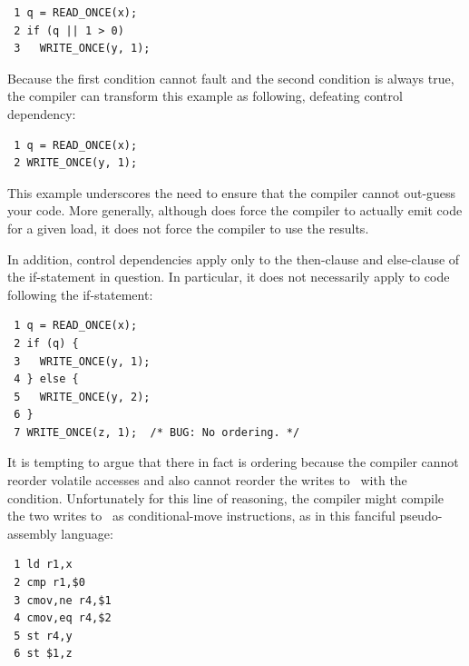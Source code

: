 \vspace{5pt}
\begin{minipage}[t]{\columnwidth}
\scriptsize
\begin{verbatim}
 1 q = READ_ONCE(x);
 2 if (q || 1 > 0)
 3   WRITE_ONCE(y, 1);
\end{verbatim}
\end{minipage}
\vspace{5pt}

Because the first condition cannot fault and the second condition is
always true, the compiler can transform this example as following,
defeating control dependency:

\vspace{5pt}
\begin{minipage}[t]{\columnwidth}
\scriptsize
\begin{verbatim}
 1 q = READ_ONCE(x);
 2 WRITE_ONCE(y, 1);
\end{verbatim}
\end{minipage}
\vspace{5pt}

This example underscores the need to ensure that the compiler cannot
out-guess your code.
More generally, although  does force
the compiler to actually emit code for a given load, it does not force
the compiler to use the results.

In addition, control dependencies apply only to the then-clause and
else-clause of the if-statement in question.
In particular, it does
not necessarily apply to code following the if-statement:

\vspace{5pt}
\begin{minipage}[t]{\columnwidth}
\scriptsize
\begin{verbatim}
 1 q = READ_ONCE(x);
 2 if (q) {
 3   WRITE_ONCE(y, 1);
 4 } else {
 5   WRITE_ONCE(y, 2);
 6 }
 7 WRITE_ONCE(z, 1);  /* BUG: No ordering. */
\end{verbatim}
\end{minipage}
\vspace{5pt}

It is tempting to argue that there in fact is ordering because the
compiler cannot reorder volatile accesses and also cannot reorder
the writes to~ with the condition.
Unfortunately for this line
of reasoning, the compiler might compile the two writes to~ as
conditional-move instructions, as in this fanciful pseudo-assembly
language:

\vspace{5pt}
\begin{minipage}[t]{\columnwidth}
\scriptsize
\begin{verbatim}
 1 ld r1,x
 2 cmp r1,$0
 3 cmov,ne r4,$1
 4 cmov,eq r4,$2
 5 st r4,y
 6 st $1,z
\end{verbatim}
\end{minipage}
\vspace{5pt}

